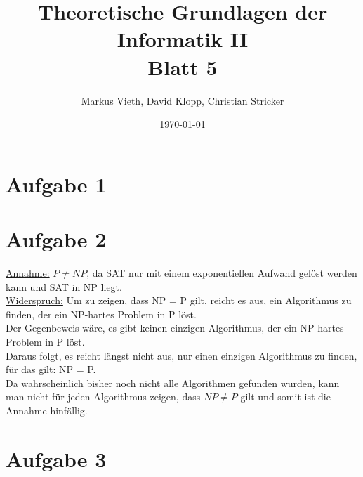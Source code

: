 \documentclass[a4paper,11pt,twoside]{article}
\title{Theoretische Grundlagen der Informatik II\\ Blatt 5}
\author{Markus Vieth, David Klopp, Christian Stricker}
\date{\today}
\begin{document}
\maketitle
\cleardoublepage
\pagestyle{myheadings}

\section*{Aufgabe 1}


\section*{Aufgabe 2}
\underline{Annahme:}  $P \neq NP$, da SAT nur mit einem exponentiellen Aufwand gelöst werden kann und SAT in NP liegt.\\
\underline {Widerspruch:} Um zu zeigen, dass NP = P gilt, reicht es aus, ein Algorithmus zu finden, der ein NP-hartes Problem in P löst.\\
Der Gegenbeweis wäre, es gibt keinen einzigen Algorithmus, der ein NP-hartes Problem in P löst. \\
Daraus folgt, es reicht längst nicht aus, nur einen einzigen Algorithmus zu finden, für das gilt: NP = P.\\
Da wahrscheinlich bisher noch nicht alle Algorithmen gefunden wurden, kann man nicht für jeden Algorithmus zeigen, dass $NP \neq P$ gilt und somit ist die Annahme hinfällig.



\section*{Aufgabe 3}
\end{document}
